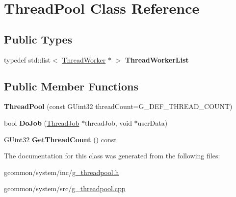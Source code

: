 \hypertarget{class_thread_pool}{\section{Thread\-Pool Class Reference}
\label{class_thread_pool}
}
\subsection*{Public Types}
\begin{DoxyCompactItemize}
\item 
\hypertarget{class_thread_pool_a8b34f96bdcec943797a3950d264bec5d}{typedef std\-::list$<$ \hyperlink{class_thread_worker}{Thread\-Worker} $\ast$ $>$ {\bfseries Thread\-Worker\-List}}\label{class_thread_pool_a8b34f96bdcec943797a3950d264bec5d}

\end{DoxyCompactItemize}
\subsection*{Public Member Functions}
\begin{DoxyCompactItemize}
\item 
\hypertarget{class_thread_pool_afab3450453b369f3ad82bdb8ef5af1a8}{{\bfseries Thread\-Pool} (const G\-Uint32 thread\-Count=G\-\_\-\-D\-E\-F\-\_\-\-T\-H\-R\-E\-A\-D\-\_\-\-C\-O\-U\-N\-T)}\label{class_thread_pool_afab3450453b369f3ad82bdb8ef5af1a8}

\item 
\hypertarget{class_thread_pool_af762138c8fdf934ecdb97a0899a76bd6}{bool {\bfseries Do\-Job} (\hyperlink{class_thread_job}{Thread\-Job} $\ast$thread\-Job, void $\ast$user\-Data)}\label{class_thread_pool_af762138c8fdf934ecdb97a0899a76bd6}

\item 
\hypertarget{class_thread_pool_afc17fe3b3625bf52ded06a7e48ae97ec}{G\-Uint32 {\bfseries Get\-Thread\-Count} () const }\label{class_thread_pool_afc17fe3b3625bf52ded06a7e48ae97ec}

\end{DoxyCompactItemize}


The documentation for this class was generated from the following files\-:\begin{DoxyCompactItemize}
\item 
gcommon/system/inc/\hyperlink{g__threadpool_8h}{g\-\_\-threadpool.\-h}\item 
gcommon/system/src/\hyperlink{g__threadpool_8cpp}{g\-\_\-threadpool.\-cpp}\end{DoxyCompactItemize}
